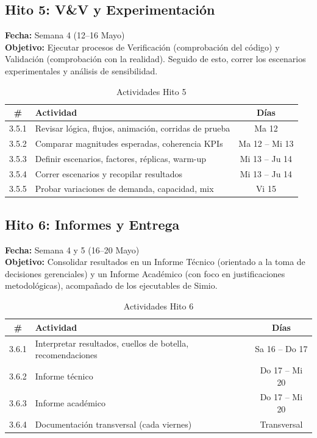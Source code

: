 \documentclass[11pt,letterpaper]{article}
\begin{document}
\subsection{Hito 5: V\&V y Experimentación}
\textbf{Fecha:} Semana 4 (12–16 Mayo)\\
\textbf{Objetivo:} Ejecutar procesos de Verificación (comprobación del código) y Validación (comprobación con la realidad). Seguido de esto, correr los escenarios experimentales y análisis de sensibilidad.

\begin{table}[h!]
    \centering
    \small
    \caption{Actividades Hito 5}
    \vspace{0.2cm}
    \begin{tabular}{cp{10cm}c}
        \toprule
        \textbf{\#} & \textbf{Actividad} & \textbf{Días} \\
        \midrule
        3.5.1 & Revisar lógica, flujos, animación, corridas de prueba & Ma 12 \\
        3.5.2 & Comparar magnitudes esperadas, coherencia KPIs & Ma 12 -- Mi 13 \\
        3.5.3 & Definir escenarios, factores, réplicas, warm-up & Mi 13 -- Ju 14 \\
        3.5.4 & Correr escenarios y recopilar resultados & Mi 13 -- Ju 14 \\
        3.5.5 & Probar variaciones de demanda, capacidad, mix & Vi 15 \\
        \bottomrule
    \end{tabular}
\end{table}

\subsection{Hito 6: Informes y Entrega}
\textbf{Fecha:} Semana 4 y 5 (16–20 Mayo)\\
\textbf{Objetivo:} Consolidar resultados en un Informe Técnico (orientado a la toma de decisiones gerenciales) y un Informe Académico (con foco en justificaciones metodológicas), acompañado de los ejecutables de Simio.

\begin{table}[h!]
    \centering
    \small
    \caption{Actividades Hito 6}
    \vspace{0.2cm}
    \begin{tabular}{cp{10cm}c}
        \toprule
        \textbf{\#} & \textbf{Actividad} & \textbf{Días} \\
        \midrule
        3.6.1 & Interpretar resultados, cuellos de botella, recomendaciones & Sa 16 -- Do 17 \\
        3.6.2 & Informe técnico & Do 17 -- Mi 20 \\
        3.6.3 & Informe académico & Do 17 -- Mi 20 \\
        3.6.4 & Documentación transversal (cada viernes) & Transversal \\
        \bottomrule
    \end{tabular}
\end{table}
\end{document}

